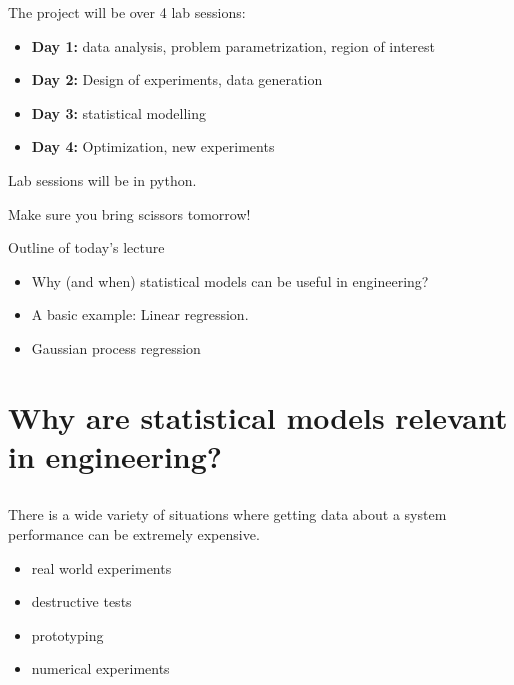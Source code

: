 \documentclass{beamer}
\begin{document}
\begin{frame}{}
The project will be over 4 lab sessions:
\vspace{2mm}
\begin{itemize}
	\item \textbf{Day 1:} data analysis, problem parametrization, region of interest
	\item \textbf{Day 2:} Design of experiments, data generation
	\item \textbf{Day 3:} statistical modelling
	\item \textbf{Day 4:} Optimization, new experiments
\end{itemize}
Lab sessions will be in python.
\vspace{5mm}
\begin{center}
	Make sure you bring scissors tomorrow!
\end{center}
\end{frame}

\begin{frame}{}
Outline of today's lecture
\vspace{0.2cm}
\begin{itemize}
	\item Why (and when) statistical models can be useful in engineering?
	\item A basic example: Linear regression.
	\item Gaussian process regression
\end{itemize}
\end{frame}

\section[Context]{Why are statistical models relevant in engineering?}
\subsection{}

\begin{frame}{}
There is a wide variety of situations where getting data about a system performance can be extremely expensive.
\begin{itemize}
	\item real world experiments
	\item destructive tests
	\item prototyping
	\item numerical experiments
\end{itemize}
\end{frame}
\end{document}
